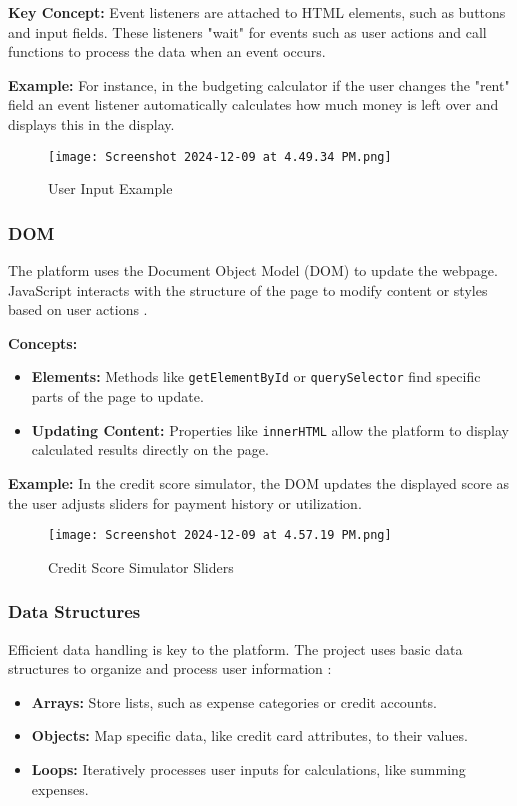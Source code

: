 \documentclass[11pt,twocolumn]{article}
\begin{document}
\textbf{Key Concept:} Event listeners are attached to HTML elements, such as buttons and input fields. These listeners "wait" for events such as user actions and call functions to process the data when an event occurs.

\textbf{Example:} For instance, in the budgeting calculator if the user changes the "rent" field an event listener automatically calculates how much money is left over and displays this in the display.

\begin{figure}[!h]
    \centering
    \texttt{[image: Screenshot 2024-12-09 at 4.49.34 PM.png]}
    \caption{User Input Example}
    \label{fig:enter-label}
\end{figure}

\subsubsection{DOM}
The platform uses the Document Object Model (DOM) to update the webpage. JavaScript interacts with the structure of the page to modify content or styles based on user actions \cite{dom}.

\textbf{Concepts:}
\begin{itemize}
    \item \textbf{Elements:} Methods like \texttt{getElementById} or \texttt{querySelector} find specific parts of the page to update.
    \item \textbf{Updating Content:} Properties like \texttt{innerHTML} allow the platform to display calculated results directly on the page.
\end{itemize}

\textbf{Example:} In the credit score simulator, the DOM updates the displayed score as the user adjusts sliders for payment history or utilization.

\begin{figure}[!h]
    \centering
    \texttt{[image: Screenshot 2024-12-09 at 4.57.19 PM.png]}
    \caption{Credit Score Simulator Sliders}
    \label{fig:enter-label}
\end{figure}

\subsubsection{Data Structures}
Efficient data handling is key to the platform. The project uses basic data structures to organize and process user information \cite{data_structures}:
\begin{itemize}
    \item \textbf{Arrays:} Store lists, such as expense categories or credit accounts.
    \item \textbf{Objects:} Map specific data, like credit card attributes, to their values.
    \item \textbf{Loops:} Iteratively processes user inputs for calculations, like summing expenses.
\end{itemize}
\end{document}
